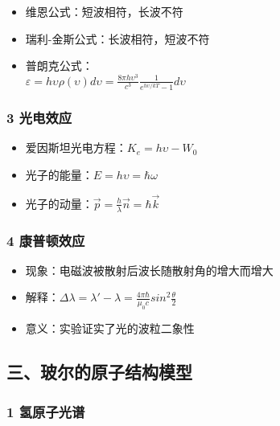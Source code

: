 \documentclass[UTF8,twocolumn]{ctexart}
\providecommand{\tightlist}{%
  \setlength{\itemsep}{0pt}\setlength{\parskip}{0pt}}
\begin{document}
\begin{itemize}
\tightlist
\item
  维恩公式：短波相符，长波不符
\item
  瑞利-金斯公式：长波相符，短波不符
\item
  普朗克公式：\\\(\varepsilon =h\upsilon\)\(\rho(\upsilon)d\upsilon=\frac{8\pi h\upsilon^3}{c^3}\frac{1}{e^{h\upsilon/kT}-1}d\upsilon\)
\end{itemize}

\hypertarget{ux5149ux7535ux6548ux5e94}{%
\subsubsection{3 光电效应}\label{ux5149ux7535ux6548ux5e94}}

\begin{itemize}
\tightlist
\item
  爱因斯坦光电方程：\(K_e=h\upsilon-W_0\)
\item
  光子的能量：\(E=h\upsilon=\hbar\omega\)
\item
  光子的动量：\(\vec{p}=\frac{h}{\lambda}\vec{n}=\hbar\vec{k}\)
\end{itemize}

\hypertarget{ux5eb7ux666eux987fux6548ux5e94}{%
\subsubsection{4 康普顿效应}\label{ux5eb7ux666eux987fux6548ux5e94}}

\begin{itemize}
\tightlist
\item
  现象：电磁波被散射后波长随散射角的增大而增大
\item
  解释：\(\Delta\lambda=\lambda'-\lambda=\frac{4\pi\hbar}{\mu_0c}sin^2\frac{\theta}{2}\)
\item
  意义：实验证实了光的波粒二象性
\end{itemize}

\hypertarget{ux4e09ux73bbux5c14ux7684ux539fux5b50ux7ed3ux6784ux6a21ux578b}{%
\subsection{三、玻尔的原子结构模型}\label{ux4e09ux73bbux5c14ux7684ux539fux5b50ux7ed3ux6784ux6a21ux578b}}

\hypertarget{ux6c22ux539fux5b50ux5149ux8c31}{%
\subsubsection{1 氢原子光谱}\label{ux6c22ux539fux5b50ux5149ux8c31}}
\end{document}
